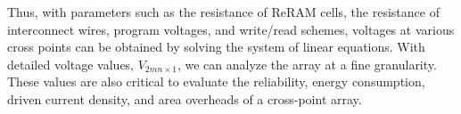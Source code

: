 %
%
Thus, with parameters such as the resistance of ReRAM cells, the
resistance of interconnect wires, program voltages, and write/read
schemes, voltages at various cross points can be obtained by solving the
system of linear equations. With detailed voltage values,
$V_{2mn{\times}1}$, we can analyze the array at a fine granularity. These
values are also critical to evaluate the reliability, energy consumption,
driven current density, and area overheads of a cross-point array.
